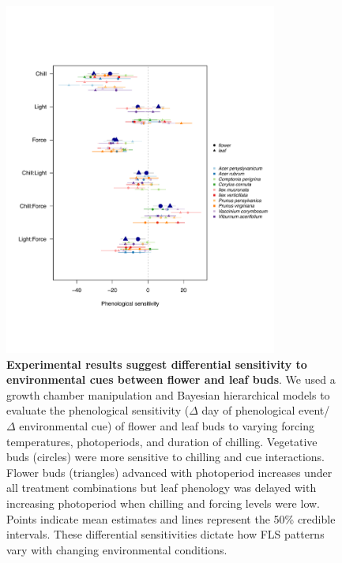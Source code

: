 \documentclass[11pt]{article}\usepackage[]{graphicx}\usepackage[]{color}
\begin{document}
{\begin{figure}[h!]
    \label{fig:simulations}
\end{figure}
\pagebreak


\begin{figure}[h!]
    \centering
         \includegraphics[width=0.8\textwidth]{..//Plots/Flobuds_manuscript_figs/budburstvsflowering.pdf}
    \caption{\textbf{Experimental results suggest differential sensitivity to environmental cues between flower and leaf buds}. We used a growth chamber manipulation and Bayesian hierarchical models to evaluate the phenological sensitivity ($\Delta$ day of phenological event/ $\Delta$ environmental cue) of flower and leaf buds to varying forcing temperatures, photoperiods, and duration of chilling.   Vegetative buds (circles) were more sensitive to chilling and cue interactions. Flower buds (triangles) advanced with photoperiod increases under all treatment combinations but leaf phenology was delayed with increasing photoperiod when chilling and forcing levels were low. Points indicate mean estimates and lines represent the 50\% credible intervals. These differential sensitivities dictate how FLS patterns vary with changing environmental conditions.}
    \label{fig:model}
\end{figure}

}
\end{document}
